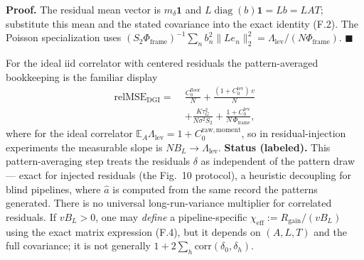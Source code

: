 \noindent\textbf{Proof.} The residual mean vector is $m_\delta\mathbf1$ and $L\operatorname{diag}(b)\mathbf1=Lb=LAT$; substitute this mean and the stated covariance into the exact identity (F.2). The Poisson specialization uses $(S_2\Phi_{\mathrm{frame}})^{-1}\sum_nb_n^2\|Le_n\|_2^2=\Lambda_{\mathrm{lev}}/(N\Phi_{\mathrm{frame}})$. \hfill$\blacksquare$

For the ideal iid correlator with centered residuals the pattern-averaged bookkeeping is the familiar display
\begin{align*}
\mathrm{relMSE}_{\mathrm{DGI}}=\;&\frac{C_0^{\mathrm{floor}}}{N}+\frac{(1+C_0^{\mathrm{lev}})\,v}{N}\\
&+\frac{K\tau_G^2}{N\sigma^2S_2}+\frac{1+C_0^{\mathrm{lev}}}{N\,\Phi_{\mathrm{frame}}}, \tag{F.11}
\end{align*}
where for the ideal correlator $\mathbb{E}_A\Lambda_{\mathrm{lev}}=1+C_0^{\mathrm{raw,moment}}$, so in residual-injection experiments the measurable slope is $NB_L\to\Lambda_{\mathrm{lev}}$. \textbf{Status (labeled).} This pattern-averaging step treats the residuals $\delta$ as independent of the pattern draw --- exact for injected residuals (the Fig.~10 protocol), a heuristic decoupling for blind pipelines, where $\hat a$ is computed from the same record the patterns generated. There is no universal long-run-variance multiplier for correlated residuals. If $vB_L>0$, one may \emph{define} a pipeline-specific $\chi_{\mathrm{eff}}:=R_{\mathrm{gain}}/(vB_L)$ using the exact matrix expression (F.4), but it depends on $(A,L,T)$ and the full covariance; it is not generally $1+2\sum_h\mathrm{corr}(\delta_0,\delta_h)$.

